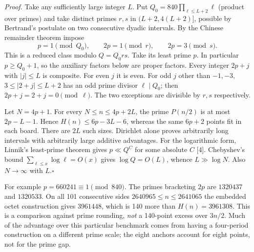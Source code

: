 \documentclass[10pt]{article}
\newcommand{\qed}{\hfill$\square$}
\begin{document}
\textit{Proof.} Take any sufficiently large integer $L$. Put $Q_0=840\prod_{\ell\le L+2}\ell$ (product over primes) and take distinct primes $r,s$ in $(L+2,4(L+2)]$, possible by Bertrand's postulate on two consecutive dyadic intervals. By the Chinese remainder theorem impose
\[
 p=1\pmod{Q_0},\qquad 2p=1\pmod r,\qquad 2p=3\pmod s .
\]
This is a reduced class modulo $Q=Q_0rs$. Take its least prime $p$. In particular $p\ge Q_0+1$, so the auxiliary factors below are proper factors. Every integer $2p+j$ with $|j|\le L$ is composite. For even $j$ it is even. For odd $j$ other than $-1,-3$, $3\le |2+j|\le L+2$ has an odd prime divisor $\ell\mid Q_0$; then $2p+j=2+j=0\pmod\ell$. The two exceptions are divisible by $r,s$ respectively.

Let $N=4p+1$. For every $N\le n\le 4p+2L$, the prime $P(n/2)$ is at most $2p-L-1$. Hence $H(n)\le6p-3L-6$, whereas the same $6p+2$ points fit in each board. There are $2L$ such sizes. Dirichlet alone proves arbitrarily long intervals with arbitrarily large additive advantages. For the logarithmic form, Linnik's least-prime theorem gives $p\ll Q^C$ for some absolute $C$ [4]. Chebyshev's bound $\sum_{\ell\le x}\log\ell=O(x)$ gives $\log Q=O(L)$, whence $L\gg\log N$. Also $N\to\infty$ with $L$.\qed

For example $p=660241\equiv1\pmod{840}$. The primes bracketing $2p$ are $1320437$ and $1320533$. On all 101 consecutive sides $2640965\le n\le2641065$ the embedded octet construction gives $3961448$, which is 140 more than $H(n)=3961308$. This is a comparison against prime rounding, \emph{not} a 140-point excess over $3n/2$. Much of the advantage over this particular benchmark comes from having a four-period construction on a different prime scale; the eight anchors account for eight points, not for the prime gap.
\end{document}
